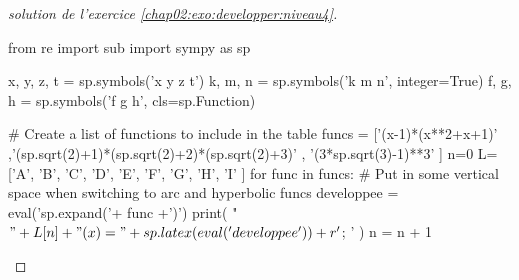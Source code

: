 \begin{proof}[solution de l'exercice \ref{chap02:exo:developper:niveau4}]
\begin{pycode}
from re import sub
import sympy as sp

x, y, z, t = sp.symbols('x y z t')
k, m, n = sp.symbols('k m n', integer=True)
f, g, h = sp.symbols('f g h', cls=sp.Function)

# Create a list of functions to include in the table
funcs = ['(x-1)*(x**2+x+1)'
,'(sp.sqrt(2)+1)*(sp.sqrt(2)+2)*(sp.sqrt(2)+3)'
, '(3*sp.sqrt(3)-1)**3'
]
n=0
L=['A', 'B', 'C', 'D', 'E', 'F', 'G', 'H', 'I'  ]
for func in funcs:
	# Put in some vertical space when switching to arc and hyperbolic funcs 
	developpee =  eval('sp.expand('+ func +')') 
	print( "$"+L[n] + "(x) =" + sp.latex( eval('developpee') )  + r'$; ' ) 
	n     = n + 1 
\end{pycode}
\end{proof}
%	 
